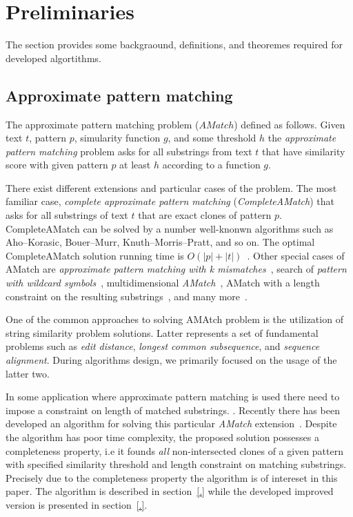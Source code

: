 \section{Preliminaries}
\label{section:preliminaries}

The section provides some backgraound, definitions, and theoremes required for
developed algortithms.

\subsection{Approximate pattern matching}
The approximate pattern matching problem ($AMatch$) defined as follows.
Given text $t$, pattern $p$, simularity function $g$, and some threshold $h$ the \emph{approximate pattern matching} problem asks for all substrings from text $t$ that have similarity score  with given pattern $p$ at least $h$ according to a function $g$.  

There exist different extensions and particular cases of the problem.
The most familiar case, \emph{complete approximate pattern matching} (\emph{CompleteAMatch}) that asks for all substrings of text $t$ that are exact clones of pattern $p$.
CompleteAMatch can be solved by a number well-knonwn algorithms such as Aho--Korasic, Bouer--Murr, Knuth--Morris--Pratt, and so on.
The optimal CompleteAMatch solution running time is $O(|p|+|t|)$~\cite{.}.
Other special cases of AMatch are \emph{approximate pattern matching with k mismatches}~\cite{.}, search of \emph{pattern with wildcard symbols}~\cite{.}, multidimensional \emph{AMatch}~\cite{.}, AMatch with a length constraint on the resulting substrings~\cite{.}, and many more~\cite{.}.

One of the common approaches to solving AMAtch problem is the utilization of string similarity problem solutions.
Latter represents a set of fundamental problems such as \emph{edit distance}, \emph{longest common subsequence}, and \emph{sequence alignment}.
During algorithms design, we primarily focused on the usage of the latter two.

In some application where approximate pattern matching is used there need to impose a constraint on length of matched substrings.
.
Recently there has been developed an algorithm for solving this particular \emph{AMatch} extension~\cite{.}.
Despite the algorithm has poor time complexity, the proposed solution possesses a completeness property, i.e it founds \emph{all} non-intersected clones of a given pattern with specified similarity threshold and length constraint on matching substrings.
Precisely due to the completeness property the algorithm is of intereset in this paper.
The algorithm is described in section~\ref{.} while the developed improved version is presented in section~\ref{.}.

